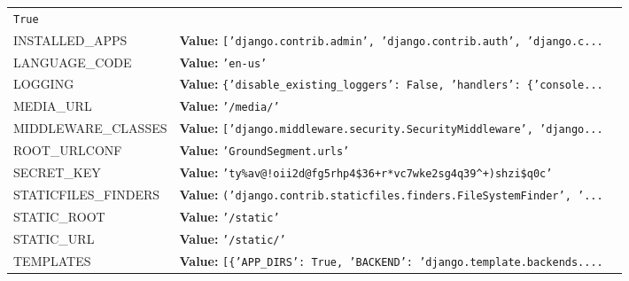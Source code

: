 \begin{longtable}{|p{\varnamewidth}|p{\vardescrwidth}|l}
{\tt True}&\\
\cline{1-2}
\raggedright I\-N\-S\-T\-A\-L\-L\-E\-D\-\_\-A\-P\-P\-S\- & \raggedright \textbf{Value:} 
{\tt \texttt{[}\texttt{'}\texttt{django.contrib.admin}\texttt{'}\texttt{, }\texttt{'}\texttt{django.contrib.auth}\texttt{'}\texttt{, }\texttt{'}\texttt{django.c}\texttt{...}}&\\
\cline{1-2}
\raggedright L\-A\-N\-G\-U\-A\-G\-E\-\_\-C\-O\-D\-E\- & \raggedright \textbf{Value:} 
{\tt \texttt{'}\texttt{en-us}\texttt{'}}&\\
\cline{1-2}
\raggedright L\-O\-G\-G\-I\-N\-G\- & \raggedright \textbf{Value:} 
{\tt \texttt{\{}\texttt{'}\texttt{disable\_existing\_loggers}\texttt{'}\texttt{: }False\texttt{, }\texttt{'}\texttt{handlers}\texttt{'}\texttt{: }\texttt{\{}\texttt{'}\texttt{console}\texttt{...}}&\\
\cline{1-2}
\raggedright M\-E\-D\-I\-A\-\_\-U\-R\-L\- & \raggedright \textbf{Value:} 
{\tt \texttt{'}\texttt{/media/}\texttt{'}}&\\
\cline{1-2}
\raggedright M\-I\-D\-D\-L\-E\-W\-A\-R\-E\-\_\-C\-L\-A\-S\-S\-E\-S\- & \raggedright \textbf{Value:} 
{\tt \texttt{[}\texttt{'}\texttt{django.middleware.security.SecurityMiddleware}\texttt{'}\texttt{, }\texttt{'}\texttt{django}\texttt{...}}&\\
\cline{1-2}
\raggedright R\-O\-O\-T\-\_\-U\-R\-L\-C\-O\-N\-F\- & \raggedright \textbf{Value:} 
{\tt \texttt{'}\texttt{GroundSegment.urls}\texttt{'}}&\\
\cline{1-2}
\raggedright S\-E\-C\-R\-E\-T\-\_\-K\-E\-Y\- & \raggedright \textbf{Value:} 
{\tt \texttt{'}\texttt{ty\%av@!oii2d@fg5rhp4\$36+r*vc7wke2sg4q39{\textasciicircum}+)shzi\$q0c}\texttt{'}}&\\
\cline{1-2}
\raggedright S\-T\-A\-T\-I\-C\-F\-I\-L\-E\-S\-\_\-F\-I\-N\-D\-E\-R\-S\- & \raggedright \textbf{Value:} 
{\tt \texttt{(}\texttt{'}\texttt{django.contrib.staticfiles.finders.FileSystemFinder}\texttt{'}\texttt{, }\texttt{'}\texttt{...}}&\\
\cline{1-2}
\raggedright S\-T\-A\-T\-I\-C\-\_\-R\-O\-O\-T\- & \raggedright \textbf{Value:} 
{\tt \texttt{'}\texttt{/static}\texttt{'}}&\\
\cline{1-2}
\raggedright S\-T\-A\-T\-I\-C\-\_\-U\-R\-L\- & \raggedright \textbf{Value:} 
{\tt \texttt{'}\texttt{/static/}\texttt{'}}&\\
\cline{1-2}
\raggedright T\-E\-M\-P\-L\-A\-T\-E\-S\- & \raggedright \textbf{Value:} 
{\tt \texttt{[}\texttt{\{}\texttt{'}\texttt{APP\_DIRS}\texttt{'}\texttt{: }True\texttt{, }\texttt{'}\texttt{BACKEND}\texttt{'}\texttt{: }\texttt{'}\texttt{django.template.backends.}\texttt{...}}&\\

\end{longtable}

